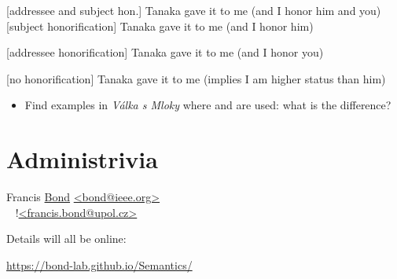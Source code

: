 \documentclass[a4paper,landscape,headrule,footrule,xetex,25pt]{foils}
\begin{document}
\begin{exe}
  \ex {} \hfill [addressee and subject hon.]
  \trans Tanaka gave it to me (and I honor him and you)
 \ex {} \hfill [subject honorification]
  \trans Tanaka gave it to me (and I honor him)

 \ex {} \hfill [addressee honorification]
  \trans Tanaka gave it to me (and I honor you)

 \ex {} \hfill [no honorification]
  \trans Tanaka gave it to me (implies I am higher status than him)

\end{exe}

\begin{itemize}
\item  Find examples in \textit{Válka s Mloky} where  and  are used:  what is the difference? \task
\end{itemize}



\section{Administrivia}

\begin{description}\addtolength{\itemsep}{-5mm}
\item [Coordinator]  Francis \ul{Bond} 
  {\small \url{<bond@ieee.org>}
    \\ ~ \hfill !\url{<francis.bond@upol.cz>}}
\item Details will all be  online:
  \begin{center}
    \url{https://bond-lab.github.io/Semantics/}    
  \end{center}
\end{description}


\end{document}

